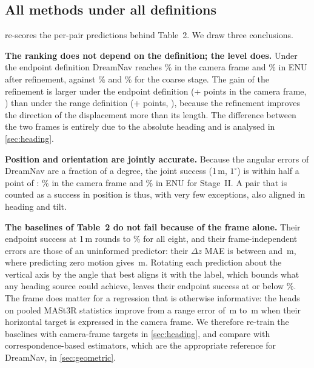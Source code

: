 \subsection{All methods under all definitions}



 re-scores the per-pair predictions behind Table~2. We draw three conclusions.

\noindent\textbf{The ranking does not depend on the definition; the level does.} Under the endpoint definition DreamNav reaches \SiiCamSRe\% \ci{\SiiCamSReLo}{\SiiCamSReHi} in the camera frame and \SiiEnuSRe\% \ci{\SiiEnuSReLo}{\SiiEnuSReHi} in ENU after refinement, against \SiCamSRe\% and \SiEnuSRe\% for the coarse stage. The gain of the refinement is larger under the endpoint definition (+\gainSReCam{} points in the camera frame, \ci{\gainSReCamLo}{\gainSReCamHi}) than under the range definition (+\gainSRd{} points, \ci{\gainSRdLo}{\gainSRdHi}), because the refinement improves the direction of the displacement more than its length. The difference between the two frames is entirely due to the absolute heading and is analysed in \cref{sec:heading}.

\noindent\textbf{Position and orientation are jointly accurate.} Because the angular errors of DreamNav are a fraction of a degree, the joint success \SRf(1\,m, $1^\circ$) is within half a point of \SRe: \SiiCamSRf\% in the camera frame and \SiiEnuSRf\% in ENU for Stage~II. A pair that is counted as a success in position is thus, with very few exceptions, also aligned in heading and tilt.

\noindent\textbf{The baselines of Table~2 do not fail because of the frame alone.} Their endpoint success at 1\,m rounds to \baseMaxSRe\% for all eight, and their frame-independent errors are those of an uninformed predictor: their $\Delta z$ MAE is between \baseMinZ{} and \baseMaxZ\,m, where predicting zero motion gives \zeroZ\,m. Rotating each prediction about the vertical axis by the angle that best aligns it with the label, which bounds what any heading source could achieve, leaves their endpoint success at or below \baseMaxYawFree\%. The frame does matter for a regression that is otherwise informative: the heads on pooled MASt3R statistics improve from a range error of \mlpWorldD\,m to \mlpCamD\,m when their horizontal target is expressed in the camera frame. We therefore re-train the baselines with camera-frame targets in \cref{sec:heading}, and compare with correspondence-based estimators, which are the appropriate reference for DreamNav, in \cref{sec:geometric}.
